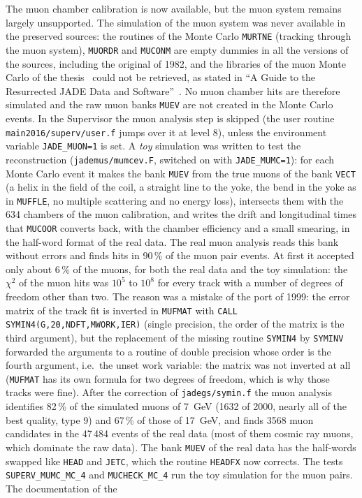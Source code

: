 The muon chamber calibration is now available, but the muon system remains largely unsupported.
The simulation of the muon system was never available in the preserved sources: the routines of the Monte Carlo
\texttt{MURTNE} (tracking through the muon system), \texttt{MUORDR} and \texttt{MUCONM} are empty dummies in all the versions of the sources, including the original of 1982, and
the libraries of the muon Monte Carlo of the thesis~\cite{Bowdery:1982thesis} could not be retrieved, as stated in ``A Guide to the Resurrected JADE Data and Software''~\cite{JCN:103}.
No muon chamber hits are therefore simulated and the raw muon banks \texttt{MUEV} are not created in the Monte Carlo events.
In the Supervisor the muon analysis step is skipped
(the user routine \texttt{main2016/\allowbreak{}superv/\allowbreak{}user.f} jumps over it at level 8), unless the environment variable \texttt{JADE\_MUON=1} is set.
A \emph{toy} simulation was written to test the reconstruction (\texttt{jademus/mumcev.F}, switched on with \texttt{JADE\_MUMC=1}): for each Monte Carlo event it makes the bank \texttt{MUEV} from the true muons of the bank \texttt{VECT}
(a helix in the field of the coil, a straight line to the yoke, the bend in the yoke as in \texttt{MUFFLE}, no multiple scattering and no energy loss), intersects them with the 634 chambers of the muon calibration, and writes the
drift and longitudinal times that \texttt{MUCOOR} converts back, with the chamber efficiency and a small smearing, in the half-word format of the real data.
The real muon analysis reads this bank without errors and finds hits in 90\,\% of the muon pair events. At first it accepted only about 6\,\% of the muons, for both the real data and the toy simulation: the $\chi^2$ of the muon hits was $10^5$ to $10^8$ for every track with a number of degrees of freedom other than two. The reason was a mistake of the port of 1999: the error matrix of the track fit is inverted in \texttt{MUFMAT} with \texttt{CALL SYMIN4(G,20,NDFT,MWORK,IER)} (single precision, the order of the matrix is the third argument), but the replacement of the missing routine \texttt{SYMIN4} by \texttt{SYMINV} forwarded the arguments to a routine of double precision whose order is the fourth argument, i.e.\ the unset work variable: the matrix was not inverted at all (\texttt{MUFMAT} has its own formula for two degrees of freedom, which is why those tracks were fine). After the correction of \texttt{jadegs/symin.f} the muon analysis identifies 82\,\% of the simulated muons of 7~GeV (1632 of 2000, nearly all of the best quality, type 9) and 67\,\% of those of 17~GeV, and finds 3568 muon candidates in the 47\,484 events of the real data (most of them cosmic ray muons, which dominate the raw data). The bank \texttt{MUEV} of the real data has the half-words swapped like \texttt{HEAD} and \texttt{JETC}, which the routine \texttt{HEADFX} now corrects. The tests \texttt{SUPERV\_MUMC\_MC\_4} and \texttt{MUCHECK\_MC\_4} run the toy simulation for the muon pairs. The documentation of the
